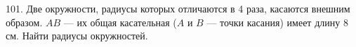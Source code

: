 101. Две окружности, радиусы которых отличаются в 4 раза, касаются внешним образом. $AB$ --- их общая касательная ($A$ и $B$ --- точки касания) имеет длину 8 см. Найти радиусы окружностей.\\
